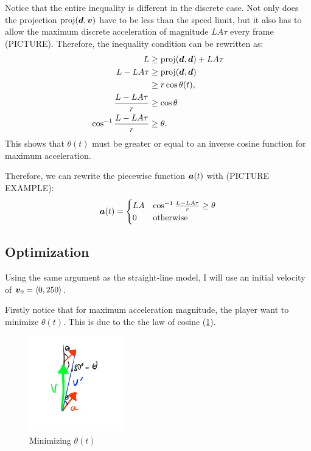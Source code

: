 Notice that the entire inequality is different in the discrete case. Not only does the projection $\text{proj}(\boldsymbol{d}, \boldsymbol{v})$ have to be less than the speed limit, but it also has to allow the maximum discrete acceleration of magnitude $LA\tau$ every frame (PICTURE). Therefore, the inequality condition can be rewritten as:
\begin{align*}
    L &\ge \text{proj}(\boldsymbol{d}, \boldsymbol{d}) + LA\tau\\
    L - LA\tau &\ge \text{proj}(\boldsymbol{d}, \boldsymbol{d})\\
    &\ge r \cos \theta(t),\\
    \frac{L - LA\tau}{r} &\ge \cos \theta\\
    \cos^{-1} \frac{L - LA\tau}{r} &\ge \theta.
\end{align*}
This shows that $\theta(t)$ must be greater or equal to an inverse cosine function for maximum acceleration.

Therefore, we can rewrite the piecewise function $\boldsymbol{a}(t)$ with (PICTURE EXAMPLE):
\[
\boldsymbol{a}(t) = \begin{cases}
    LA & \cos^{-1} \frac{L - LA\tau}{r} \ge \theta\\
    0 & \text{otherwise}
\end{cases}
\]

\subsection{Optimization}
Using the same argument as the straight-line model, I will use an initial velocity of $\boldsymbol{v}_0 = \left\langle 0, 250 \right\rangle$.

Firstly notice that for maximum acceleration magnitude, the player want to minimize $\theta(t)$. This is due to the the law of cosine (\ref{fig:min_theta}).

\begin{figure}
    \includegraphics[width=0.37\textwidth,right]{assets/min_theta.png}
    \caption{Minimizing $\theta(t)$}
    \label{fig:min_theta}
\end{figure}

